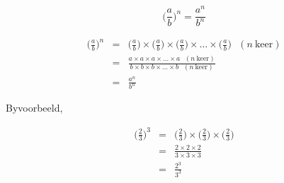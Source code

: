 

{
$$ \Big(\frac{a}{b}\Big)^n = \frac{a^n}{b^n} $$

\begin{eqnarray*}

 \Big(\frac{a}{b}\Big)^n & = & \Big(\frac{a}{b}\Big) \times \Big(\frac{a}{b}\Big) \times \Big(\frac{a}{b}\Big) \times \ldots \times \Big(\frac{a}{b}\Big) ~~~(n~\mbox{keer}) \\
                         & = & \frac{a \times a \times a \times \ldots \times a ~~~(n~\mbox{keer})}{b \times b \times b \times \ldots \times b ~~~(n~\mbox{keer})}\\
                         & = & \frac{a^n}{b^n}
\end{eqnarray*}



}




Byvoorbeeld,

\begin{eqnarray*}

\Big(\frac{2}{3}\Big)^3 & = & \Big(\frac{2}{3}\Big) \times  \Big(\frac{2}{3}\Big) \times \Big(\frac{2}{3}\Big) \\
                        & = & \frac{2 \times 2 \times 2}{3 \times 3 \times 3} \\
		        & = & \frac{2^3}{3^3}




\end{eqnarray*}







            

